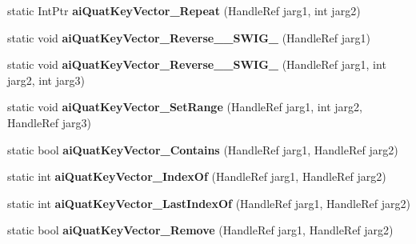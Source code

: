 \begin{DoxyCompactItemize}
\item 
\hypertarget{class_assimp_p_i_n_v_o_k_e_a255955e35558564541b3ae192d95bc11}{static Int\+Ptr {\bfseries ai\+Quat\+Key\+Vector\+\_\+\+Repeat} (Handle\+Ref jarg1, int jarg2)}\label{class_assimp_p_i_n_v_o_k_e_a255955e35558564541b3ae192d95bc11}

\item 
\hypertarget{class_assimp_p_i_n_v_o_k_e_a6cd7a5e6bd6c432b0a5a0b6cd720d950}{static void {\bfseries ai\+Quat\+Key\+Vector\+\_\+\+Reverse\+\_\+\+\_\+\+S\+W\+I\+G\+\_} (Handle\+Ref jarg1)}\label{class_assimp_p_i_n_v_o_k_e_a6cd7a5e6bd6c432b0a5a0b6cd720d950}

\item 
\hypertarget{class_assimp_p_i_n_v_o_k_e_a356793b9d98ee33a4b80e5823297f153}{static void {\bfseries ai\+Quat\+Key\+Vector\+\_\+\+Reverse\+\_\+\+\_\+\+S\+W\+I\+G\+\_} (Handle\+Ref jarg1, int jarg2, int jarg3)}\label{class_assimp_p_i_n_v_o_k_e_a356793b9d98ee33a4b80e5823297f153}

\item 
\hypertarget{class_assimp_p_i_n_v_o_k_e_ad0fcf150e9fec64fed5b871ee1d8c678}{static void {\bfseries ai\+Quat\+Key\+Vector\+\_\+\+Set\+Range} (Handle\+Ref jarg1, int jarg2, Handle\+Ref jarg3)}\label{class_assimp_p_i_n_v_o_k_e_ad0fcf150e9fec64fed5b871ee1d8c678}

\item 
\hypertarget{class_assimp_p_i_n_v_o_k_e_a3ef3cdac2ea3ce81e090c41fe45f211b}{static bool {\bfseries ai\+Quat\+Key\+Vector\+\_\+\+Contains} (Handle\+Ref jarg1, Handle\+Ref jarg2)}\label{class_assimp_p_i_n_v_o_k_e_a3ef3cdac2ea3ce81e090c41fe45f211b}

\item 
\hypertarget{class_assimp_p_i_n_v_o_k_e_a9702784fd7011f7b4e027b89ae033240}{static int {\bfseries ai\+Quat\+Key\+Vector\+\_\+\+Index\+Of} (Handle\+Ref jarg1, Handle\+Ref jarg2)}\label{class_assimp_p_i_n_v_o_k_e_a9702784fd7011f7b4e027b89ae033240}

\item 
\hypertarget{class_assimp_p_i_n_v_o_k_e_acf25b6ebc66472d164c7ad5e08bf8da5}{static int {\bfseries ai\+Quat\+Key\+Vector\+\_\+\+Last\+Index\+Of} (Handle\+Ref jarg1, Handle\+Ref jarg2)}\label{class_assimp_p_i_n_v_o_k_e_acf25b6ebc66472d164c7ad5e08bf8da5}

\item 
\hypertarget{class_assimp_p_i_n_v_o_k_e_a5804f75acfea8a679cbad05fbe948857}{static bool {\bfseries ai\+Quat\+Key\+Vector\+\_\+\+Remove} (Handle\+Ref jarg1, Handle\+Ref jarg2)}\label{class_assimp_p_i_n_v_o_k_e_a5804f75acfea8a679cbad05fbe948857}


\end{DoxyCompactItemize}

